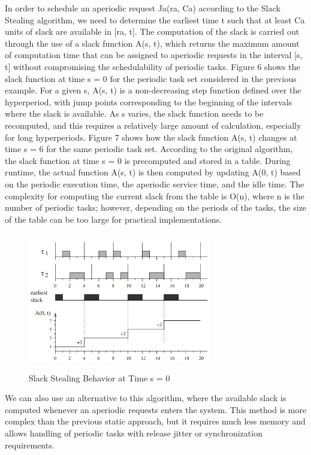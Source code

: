 \documentclass[conference]{IEEEtran}
\begin{document}
In order to schedule an aperiodic request Ja(ra, Ca) according to the Slack Stealing
algorithm, we need to determine the earliest time t such that at least Ca units of slack
are available in [ra, t]. The computation of the slack is carried out through the use of
a slack function A(s, t), which returns the maximum amount of computation time that
can be assigned to aperiodic requests in the interval [s, t] without compromising the
schedulability of periodic tasks.
Figure 6 shows the slack function at time s = 0 for the periodic task set considered
in the previous example. For a given s, A(s, t) is a non-decreasing step function
defined over the hyperperiod, with jump points corresponding to the beginning of the
intervals where the slack is available. As s varies, the slack function needs to be
recomputed, and this requires a relatively large amount of calculation, especially for
long hyperperiods. Figure 7 shows how the slack function A(s, t) changes at time
s = 6 for the same periodic task set.
According to the original algorithm,
the slack function at time s = 0 is precomputed and stored in a table. During runtime,
the actual function A(s, t) is then computed by updating A(0, t) based on the periodic execution time, the aperiodic service time, and the idle time. The complexity for
computing the current slack from the table is O(n), where n is the number of periodic
tasks; however, depending on the periods of the tasks, the size of the table can be too
large for practical implementations.
\begin{figure}[h!]
	\includegraphics[width=8cm, height=6cm]{behavior2}
	\caption{Slack Stealing Behavior at Time s = 0}
	\centering
\end{figure}
We can also use an alternative to this algorithm, where the available slack is computed whenever an aperiodic requests enters the system. This method is more complex than the
previous static approach, but it requires much less memory and allows handling of
periodic tasks with release jitter or synchronization requirements. 
\end{document}
